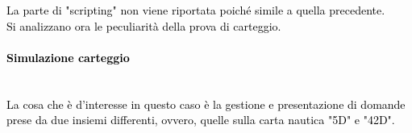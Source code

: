 \textcolor{black}{La parte di "scripting" non viene riportata poiché simile a quella precedente.}\\
\bigskip
\textcolor{black}{Si analizzano ora le peculiarità della prova di carteggio.}\\

\paragraph{\textcolor{black}{Simulazione carteggio}}\leavevmode\\

\textcolor{black}{La cosa che è d'interesse in questo caso è la gestione e presentazione di domande prese da due insiemi differenti, ovvero, quelle sulla carta nautica "5D" e "42D".}\\ 

